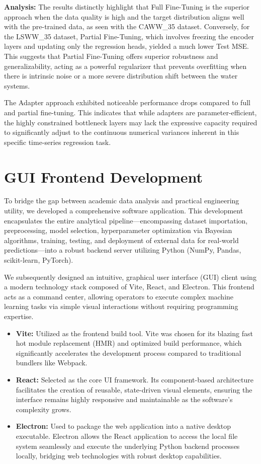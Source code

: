 \documentclass[a4paper]{article}
\begin{document}
\textbf{Analysis:} The results distinctly highlight that Full Fine-Tuning is the superior approach when the data quality is high and the target distribution aligns well with the pre-trained data, as seen with the CAWW\_35 dataset. Conversely, for the LSWW\_35 dataset, Partial Fine-Tuning, which involves freezing the encoder layers and updating only the regression heads, yielded a much lower Test MSE. This suggests that Partial Fine-Tuning offers superior robustness and generalizability, acting as a powerful regularizer that prevents overfitting when there is intrinsic noise or a more severe distribution shift between the water systems. 

The Adapter approach exhibited noticeable performance drops compared to full and partial fine-tuning. This indicates that while adapters are parameter-efficient, the highly constrained bottleneck layers may lack the expressive capacity required to significantly adjust to the continuous numerical variances inherent in this specific time-series regression task.

\section{GUI Frontend Development}

To bridge the gap between academic data analysis and practical engineering utility, we developed a comprehensive software application. This development encapsulates the entire analytical pipeline---encompassing dataset importation, preprocessing, model selection, hyperparameter optimization via Bayesian algorithms, training, testing, and deployment of external data for real-world predictions---into a robust backend server utilizing Python (NumPy, Pandas, scikit-learn, PyTorch).

We subsequently designed an intuitive, graphical user interface (GUI) client using a modern technology stack composed of Vite, React, and Electron. This frontend acts as a command center, allowing operators to execute complex machine learning tasks via simple visual interactions without requiring programming expertise. 
\begin{itemize}
    \item \textbf{Vite:} Utilized as the frontend build tool. Vite was chosen for its blazing fast hot module replacement (HMR) and optimized build performance, which significantly accelerates the development process compared to traditional bundlers like Webpack.
    \item \textbf{React:} Selected as the core UI framework. Its component-based architecture facilitates the creation of reusable, state-driven visual elements, ensuring the interface remains highly responsive and maintainable as the software's complexity grows.
    \item \textbf{Electron:} Used to package the web application into a native desktop executable. Electron allows the React application to access the local file system seamlessly and execute the underlying Python backend processes locally, bridging web technologies with robust desktop capabilities.
\end{itemize}
\end{document}
